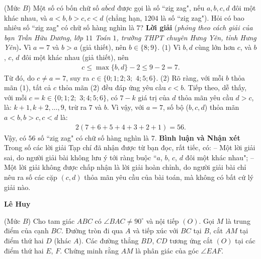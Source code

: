 \begin{multicols}{2}
	\setlength{\abovedisplayskip}{4pt}
	\setlength{\belowdisplayskip}{4pt}
	{}
	(Mức $B$) Một số có bốn chữ số $\overline{a b c d}$ được gọi là số ``zig zag", nếu $a, b, c, d$ đôi một khác nhau, và $a<b, b>c, c<d$ (chẳng hạn, $1204$ là số ``zig zag"). Hỏi có bao nhiêu số ``zig zag" có chữ số hàng nghìn là $7$?
	\vskip 0.05cm
	\textbf{\color{thachthuctoanhoc}Lời giải} (\textit{phỏng theo cách giải của bạn Trần Hữu Dương, lớp $11$ Toán $1$, trường THPT chuyên Hưng Yên, tỉnh Hưng Yên})\textbf{\color{thachthuctoanhoc}.}
	Vì $a = 7$ và $b > a$ (giả thiết), nên $b \in \{8; 9\}$. \hfill ($1$)
	\vskip 0.05cm
	Vì $b, d$ cùng lớn hơn $c$, và $b$, $c$, $d$ đôi một khác nhau (giả thiết), nên
	\begin{align*}
		c \le \max\{b, d\} - 2 \le 9 - 2 = 7.
	\end{align*}
	Từ đó, do $c \ne a = 7$, suy ra $c \in \{0; 1; 2; 3;$ $4; 5; 6\}$. \hfill($2$)
	\vskip 0.05cm
	Rõ ràng, với mỗi $b$ thỏa mãn ($1$), tất cả $c$ thỏa mãn ($2$) đều đáp ứng yêu cầu $c < b$.
	\vskip 0.05cm
	Tiếp theo, dễ thấy, với mỗi $c = k \in \{0; 1; 2;$ $3; 4; 5; 6\}$, có $7 - k$ giá trị của $d$ thỏa mãn yêu cầu $d > c$, là: $k \!+\! 1, k \!+\! 2, \ldots, 9$, trừ ra $7$ và $b$.
	\vskip 0.05cm
	Vì vậy, với $a = 7$, số bộ ($b, c, d$) thỏa mãn $a < b, b > c, c < d$ là:
	\begin{align*}
		2(7 + 6 + 5 + 4 + 3 + 2 + 1) = 56.
	\end{align*}
	Vậy, có $56$ số ``zig zag" có chữ số hàng nghìn là $7$.
	\vskip 0.05cm
	\textbf{\color{thachthuctoanhoc}Bình luận và Nhận xét}
	\vskip 0.05cm	
	Trong số các lời giải Tạp chí đã nhận được từ bạn đọc, rất tiếc, có:
	\vskip 0.05cm
	-- Một lời giải sai, do người giải bài không lưu ý tới ràng buộc ``$a$, $b$, $c$, $d$ đôi một khác nhau";
	\vskip 0.05cm
	-- Một lời giải không được chấp nhận là lời giải hoàn chỉnh, do người giải bài chỉ nêu ra số các cặp $(c, d)$ thỏa mãn yêu cầu của bài toán, mà không có bất cứ lý giải nào.
	\begin{flushright}
		\textbf{\color{thachthuctoanhoc}Lê Huy}
	\end{flushright}
	{}
	(Mức $B$) Cho tam giác $ABC$ có $\angle BAC\ne90^\circ$ và nội tiếp $(O)$. Gọi $M$ là trung điểm của cạnh $BC$. Đường tròn đi qua $A$ và tiếp xúc với $BC$ tại $B$, cắt $AM$ tại điểm thứ hai $D$ (khác $A$). Các đường thẳng $BD$, $CD$ tương ứng cắt $(O)$ tại các điểm thứ hai $E$, $F$. Chứng minh rằng $AM$ là phân giác của góc $\angle EAF$. 

\end{multicols}

